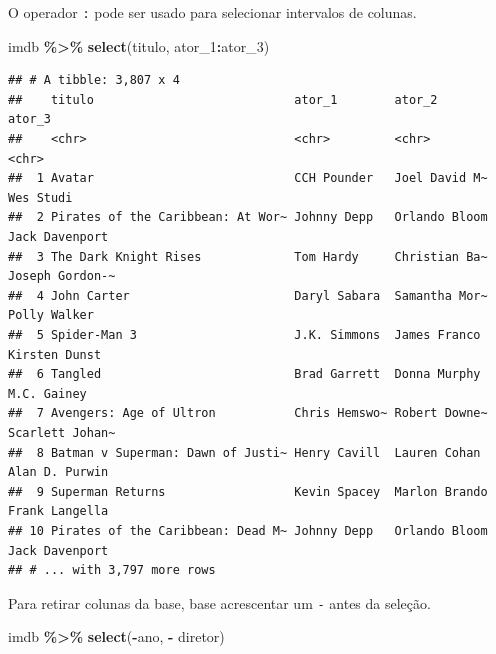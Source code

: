 \documentclass[
]{book}
\newenvironment{Shaded}{\begin{snugshade}}{\end{snugshade}}
\newcommand{\DecValTok}[1]{\textcolor[rgb]{0.00,0.00,0.81}{#1}}
\newcommand{\KeywordTok}[1]{\textcolor[rgb]{0.13,0.29,0.53}{\textbf{#1}}}
\newcommand{\NormalTok}[1]{#1}
\newcommand{\OperatorTok}[1]{\textcolor[rgb]{0.81,0.36,0.00}{\textbf{#1}}}
\newcommand{\StringTok}[1]{\textcolor[rgb]{0.31,0.60,0.02}{#1}}
\begin{document}
O operador \texttt{:} pode ser usado para selecionar intervalos de colunas.

\begin{Shaded}
\begin{Highlighting}[]
\NormalTok{imdb }\OperatorTok{\%>\%}
\StringTok{  }\KeywordTok{select}\NormalTok{(titulo, ator\_}\DecValTok{1}\OperatorTok{:}\NormalTok{ator\_}\DecValTok{3}\NormalTok{)}
\end{Highlighting}
\end{Shaded}

\begin{verbatim}
## # A tibble: 3,807 x 4
##    titulo                            ator_1        ator_2        ator_3         
##    <chr>                             <chr>         <chr>         <chr>          
##  1 Avatar                            CCH Pounder   Joel David M~ Wes Studi      
##  2 Pirates of the Caribbean: At Wor~ Johnny Depp   Orlando Bloom Jack Davenport 
##  3 The Dark Knight Rises             Tom Hardy     Christian Ba~ Joseph Gordon-~
##  4 John Carter                       Daryl Sabara  Samantha Mor~ Polly Walker   
##  5 Spider-Man 3                      J.K. Simmons  James Franco  Kirsten Dunst  
##  6 Tangled                           Brad Garrett  Donna Murphy  M.C. Gainey    
##  7 Avengers: Age of Ultron           Chris Hemswo~ Robert Downe~ Scarlett Johan~
##  8 Batman v Superman: Dawn of Justi~ Henry Cavill  Lauren Cohan  Alan D. Purwin 
##  9 Superman Returns                  Kevin Spacey  Marlon Brando Frank Langella 
## 10 Pirates of the Caribbean: Dead M~ Johnny Depp   Orlando Bloom Jack Davenport 
## # ... with 3,797 more rows
\end{verbatim}

Para retirar colunas da base, base acrescentar um \texttt{-} antes da seleção.

\begin{Shaded}
\begin{Highlighting}[]
\NormalTok{imdb }\OperatorTok{\%>\%}
\StringTok{  }\KeywordTok{select}\NormalTok{(}\OperatorTok{{-}}\NormalTok{ano, }\OperatorTok{{-}}\StringTok{ }\NormalTok{diretor)}
\end{Highlighting}
\end{Shaded}
\end{document}
